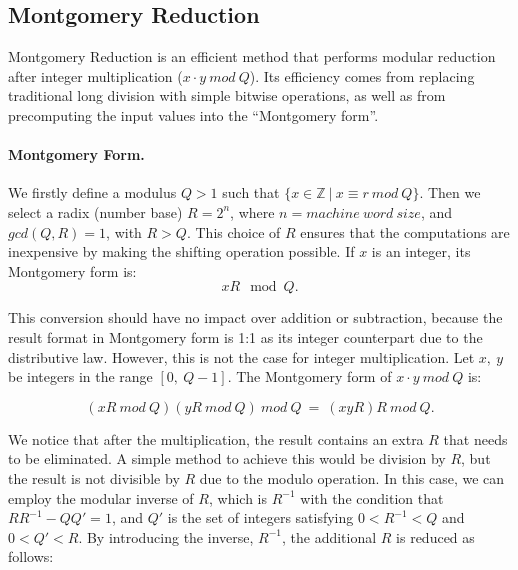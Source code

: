 \documentclass[11pt,
  titlepage=false,
  abstract=on,
]{scrreprt}
\begin{document}


\subsection{Montgomery Reduction}
Montgomery Reduction \cite{montgomery1985modular} is an efficient method that performs modular reduction after integer multiplication ($x \cdot y\ mod\ Q$).
Its efficiency comes from replacing traditional long division with simple bitwise operations, as well as from precomputing the input values into the ``Montgomery form''.

\paragraph{Montgomery Form.} We firstly define a modulus $Q > 1$ such that $\{x \in \mathbb{Z}\ |\ x \equiv r\ mod\ Q\}$. Then we select a radix (number base) $R = 2^n$, where 
$n = machine\ word\ size$, and $gcd(Q, R) = 1$, with $R > Q$. This choice of $R$ ensures that the computations are inexpensive by making the shifting operation possible.
If $x$ is an integer, its Montgomery form is:
\begin{equation*}
  xR \mod Q. 
\end{equation*}

This conversion should have no impact over addition or subtraction, because the result format in Montgomery
form is 1:1 as its integer counterpart due to the distributive law.
However, this is not the case for integer multiplication. Let $x,\ y$ be integers in the range $[0,\ Q-1]$. The Montgomery form of $x\cdot y\ mod\ Q$ is:

\begin{equation*}
  (xR\ mod\ Q)(yR\ mod\ Q)\ mod\ Q\ =\ (xyR)R\ mod\ Q.
\end{equation*}

We notice that after the multiplication, the result contains an extra $R$ that needs to be eliminated. A simple method to achieve this would be division by $R$, but
the result is not divisible by $R$ due to the modulo operation. In this case, we can employ the modular inverse of $R$, which is $R^{-1}$ with the condition that $RR^{-1} - QQ' = 1$,
and $Q'$ is the set of integers satisfying  $0 < R^{-1} < Q$ and $0 < Q' < R$.
By introducing the inverse, $R^{-1}$, the additional $R$ is reduced as follows:
\end{document}
